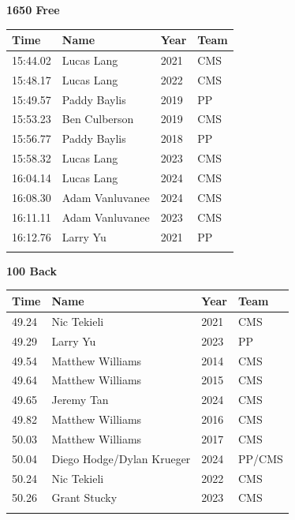 \vspace{1.2em}
\noindent\begin{minipage}[t]{0.98\textwidth}
\centering
\textbf{\textcolor{teamprimary}{1650 Free}}\par
\vspace{0.5em}
\centering
\small
\renewcommand{\arraystretch}{1.0}
\setlength{\tabcolsep}{4pt}
\begin{tabular}{@{}p{2.5cm}p{4.5cm}p{1.5cm}p{2.5cm}@{}}
\toprule
\textbf{Time} & \textbf{Name} & \textbf{Year} & \textbf{Team} \\
\midrule
15:44.02 & Lucas Lang & 2021 & CMS \\
15:48.17 & Lucas Lang & 2022 & CMS \\
15:49.57 & Paddy Baylis & 2019 & PP \\
15:53.23 & Ben Culberson & 2019 & CMS \\
15:56.77 & Paddy Baylis & 2018 & PP \\
15:58.32 & Lucas Lang & 2023 & CMS \\
16:04.14 & Lucas Lang & 2024 & CMS \\
16:08.30 & Adam Vanluvanee & 2024 & CMS \\
16:11.11 & Adam Vanluvanee & 2023 & CMS \\
16:12.76 & Larry Yu & 2021 & PP \\
\bottomrule
\vspace{0.5em}
\end{tabular}
\end{minipage}
\vspace{1.2em}
\noindent\begin{minipage}[t]{0.98\textwidth}
\centering
\textbf{\textcolor{teamprimary}{100 Back}}\par
\vspace{0.5em}
\centering
\small
\renewcommand{\arraystretch}{1.0}
\setlength{\tabcolsep}{4pt}
\begin{tabular}{@{}p{2.5cm}p{4.5cm}p{1.5cm}p{2.5cm}@{}}
\toprule
\textbf{Time} & \textbf{Name} & \textbf{Year} & \textbf{Team} \\
\midrule
49.24 & Nic Tekieli & 2021 & CMS \\
49.29 & Larry Yu & 2023 & PP \\
49.54 & Matthew Williams & 2014 & CMS \\
49.64 & Matthew Williams & 2015 & CMS \\
49.65 & Jeremy Tan & 2024 & CMS \\
49.82 & Matthew Williams & 2016 & CMS \\
50.03 & Matthew Williams & 2017 & CMS \\
50.04 & Diego Hodge/Dylan Krueger & 2024 & PP/CMS \\
50.24 & Nic Tekieli & 2022 & CMS \\
50.26 & Grant Stucky & 2023 & CMS \\
\bottomrule
\vspace{0.5em}
\end{tabular}
\end{minipage}

